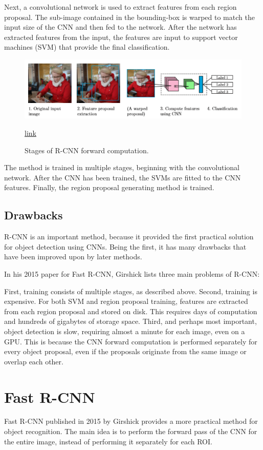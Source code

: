 Next, a convolutional network is used to extract features from each region proposal. The sub-image contained in the bounding-box is warped to match the input size of the CNN and then fed to the network. After the network has extracted features from the input, the features are input to support vector machines (SVM) that provide the final classification.
\noindent
\begin{figure}
	\centering
	\includegraphics[width=1\linewidth]{img5} 
	\caption{ Stages of R-CNN forward computation.}\href{https://www.semanticscholar.org/paper/Object-detection-from-images-using-convolutional-Stenroos/a6ee78ea9c68d99d6545227fed925a721337bb16/figure/4}{link}
	\label{fig:img5}
\end{figure}
\noindent
The method is trained in multiple stages, beginning with the convolutional network. After the CNN has been trained, the SVMs are fitted to the CNN features. Finally, the region proposal generating method is trained.

\subsection{Drawbacks}
R-CNN is an important method, because it provided the first practical solution for object detection using CNNs. Being the first, it has many drawbacks that have been improved upon by later methods.

In his 2015 paper for Fast R-CNN, Girshick lists three main problems of R-CNN:

First, training consists of multiple stages, as described above. Second, training is expensive. For both SVM and region proposal training, features are extracted from each region proposal and stored on disk. This requires days of computation and hundreds of gigabytes of storage space. Third, and perhaps most important, object detection is slow, requiring almost a minute for each image, even on a GPU. This is because the CNN forward computation is performed separately for every object proposal, even if the proposals originate from the same image or overlap each other.


\section{Fast R-CNN}
Fast R-CNN published in 2015 by Girshick provides a more practical method for object recognition. The main idea is to perform the forward pass of the CNN for the entire image, instead of performing it separately for each ROI.

